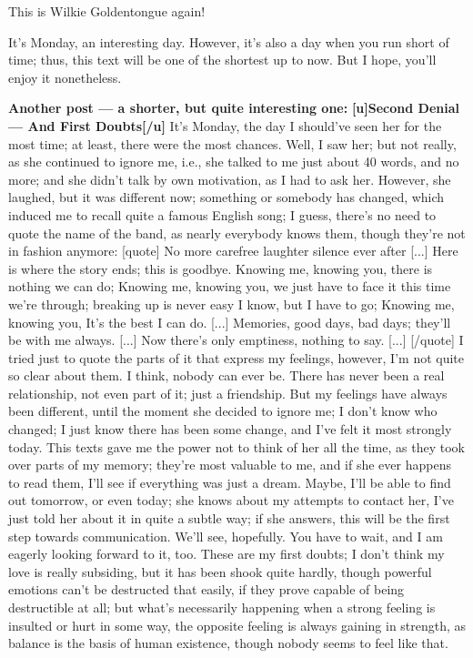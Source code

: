 This is Wilkie Goldentongue again!

It's Monday, an interesting day. However, it's also a day when you run short of time; thus, this text will be one of the shortest up to now. But I hope, you'll enjoy it nonetheless. 

\textbf{Another post --- a shorter, but quite interesting one:}
\textbf{[u]Second Denial --- And First Doubts[/u]}
It's Monday, the day I should've seen her for the most time; at least, there were the most chances. Well, I saw her; but not really, as she continued to ignore me, i.e., she talked to me just about 40 words, and no more; and she didn't talk by own motivation, as I had to ask her. 
However, she laughed, but it was different now; something or somebody has changed, which induced me to recall quite a famous English song; I guess, there's no need to quote the name of the band, as nearly everybody knows them, though they're not in fashion anymore:
[quote]
No more carefree laughter
silence ever after
[...]
Here is where the story ends;
this is goodbye. 
Knowing me, knowing you, 
there is nothing we can do; 
Knowing me, knowing you, 
we just have to face it this time we're through;
breaking up is never easy I know,
but I have to go;
Knowing me, knowing you,
It's the best I can do. 
[...]
Memories, good days, bad days;
they'll be with me always. 
[...]
Now there's only emptiness,
nothing to say.
[...]
[/quote]
I tried just to quote the parts of it that express my feelings, however, I'm not quite so clear about them. I think, nobody can ever be. There has never been a real relationship, not even part of it; just a friendship. 
But my feelings have always been different, until the moment she decided to ignore me; I don't know who changed; I just know there has been some change, and I've felt it most strongly today. This texts gave me the power not to think of her all the time, as they took over parts of my memory; they're most valuable to me, and if she ever happens to read them, I'll see if everything was just a dream. 
Maybe, I'll be able to find out tomorrow, or even today; she knows about my attempts to contact her, I've just told her about it in quite a subtle way; if she answers, this will be the first step towards communication. 
We'll see, hopefully. 
You have to wait, and I am eagerly looking forward to it, too. 
These are my first doubts; I don't think my love is really subsiding, but it has been shook quite hardly, though powerful emotions can't be destructed that easily, if they prove capable of being destructible at all; but what's necessarily happening when a strong feeling is insulted or hurt in some way, the opposite feeling is always gaining in strength, as balance is the basis of human existence, though nobody seems to feel like that. 
